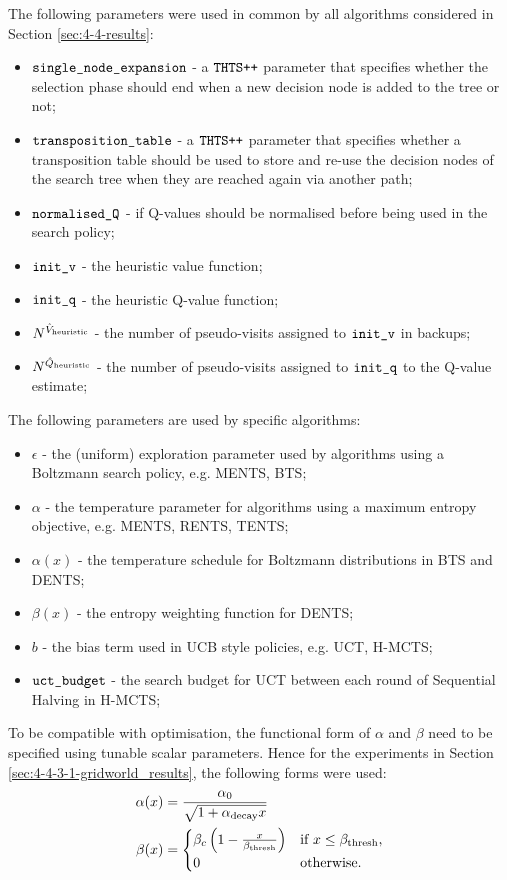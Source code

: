     The following parameters were used in common by all algorithms considered in Section \ref{sec:4-4-results}:
    \begin{itemize}
        \item ${\textnormal{\texttt{single\_node\_expansion}}}$ - a ${\textnormal{\texttt{THTS++}}}$ parameter that specifies whether the selection phase should end when a new decision node is added to the tree or not;
        \item ${\textnormal{\texttt{transposition\_table}}}$ - a ${\textnormal{\texttt{THTS++}}}$ parameter that specifies whether a transposition table should be used to store and re-use the decision nodes of the search tree when they are reached again via another path;
        \item ${\textnormal{\texttt{normalised\_Q}}}$ - if Q-values should be normalised before being used in the search policy;
        \item ${\textnormal{\texttt{init\_v}}}$ - the heuristic value function;
        \item ${\textnormal{\texttt{init\_q}}}$ - the heuristic Q-value function;
        \item $N^{{\hat{V}_{\textnormal{heuristic}}}}$ - the number of pseudo-visits assigned to ${\textnormal{\texttt{init\_v}}}$ in backups;
        \item $N^{{\hat{Q}_{\textnormal{heuristic}}}}$ - the number of pseudo-visits assigned to ${\textnormal{\texttt{init\_q}}}$  to the Q-value estimate;
    \end{itemize}

    The following parameters are used by specific algorithms:
    \begin{itemize}
        \item $\epsilon$ - the (uniform) exploration parameter used by algorithms using a Boltzmann search policy, e.g. MENTS, BTS;
        \item $\alpha$ - the temperature parameter for algorithms using a maximum entropy objective, e.g. MENTS, RENTS, TENTS;
        \item $\alpha(x)$ - the temperature schedule for Boltzmann distributions in BTS and DENTS;
        \item $\beta(x)$ - the entropy weighting function for DENTS;
        \item $b$ - the bias term used in UCB style policies, e.g. UCT, H-MCTS;
        \item ${\texttt{uct\_budget}}$ - the search budget for UCT between each round of Sequential Halving in H-MCTS;
    \end{itemize}

    To be compatible with  optimisation, the functional form of $\alpha$ and $\beta$ need to be specified using tunable scalar parameters. Hence for the experiments in Section \ref{sec:4-4-3-1-gridworld_results}, the following forms were used:
    \begin{align}
        \alpha(x) &= \frac{\alpha_0}{\sqrt{1+{\alpha_{\text{decay}}} x}} 
            \label{eq:app:parameterised_alpha} \\
        \beta(x) &= \begin{cases}
            \beta_c \left(1 - \frac{x}{{\beta_{\text{thresh}}}}\right) & \text{if } x \leq {\beta_{\text{thresh}}}, \\
            0 & \text{otherwise.}
        \end{cases}
        \label{eq:app:parameterised_beta}
    \end{align}

